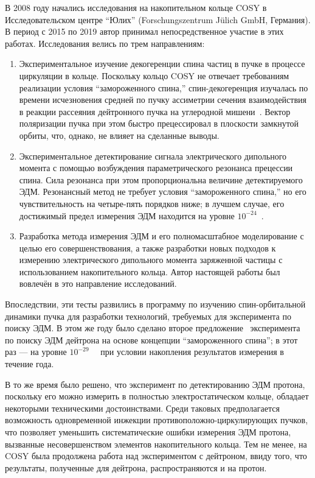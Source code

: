 В 2008 году начались исследования на накопительном кольце COSY в Исследовательском центре ``Юлих'' (Forschungszentrum J\"ulich GmbH, Германия). 
В период с 2015 по 2019 автор принимал непосредственное участие в этих работах. 
Исследования велись по трем направлениям:
\begin{enumerate}[(1)]
	\item Экспериментальное изучение декогеренции спина частиц в пучке в процессе циркуляции в кольце. 
	Поскольку кольцо COSY не отвечает требованиям реализации условия ``замороженного спина,'' 
	спин-декогеренция изучалась по времени исчезновения средней по пучку ассиметрии 
	сечения взаимодействия в реакции рассеяния дейтронного пучка на углеродной мишени~\cite{COSY:SCT:IPAC15}.
	Вектор поляризации пучка при этом быстро прецессировал в плоскости замкнутой орбиты, 
	что, однако, не влияет на сделанные выводы. 
	
	\item Экспериментальное детектирование сигнала электрического дипольного момента с помощью возбуждения параметрического резонанса прецессии спина. Сила резонанса при этом пропорциональна величине детектируемого ЭДМ. Резонансный метод не требует условия ``замороженного спина,'' но его чувствительность на четыре-пять порядков ниже; в лучшем случае, его достижимый предел измерения ЭДМ находится на уровне $10^{-24}$~\ecm. 
	
	\item Разработка метода измерения ЭДМ и его полномасштабное моделирование с целью его совершенствования, а также  разработки новых подходов к измерению электрического дипольного момента заряженной частицы с использованием накопительного кольца. Автор настоящей работы был вовлечён в это направление исследований.
\end{enumerate}

Впоследствии, эти тесты развились в программу по изучению спин-орбитальной динамики пучка 
для разработки технологий, требуемых для эксперимента по поиску ЭДМ. 
В этом же году было сделано второе предложение~\cite{BNL:Deuteron2008} эксперимента 
по поиску ЭДМ дейтрона на основе концепции ``замороженного спина''; 
в этот раз --- на уровне $10^{-29}$~\ecm~ при условии накопления результатов измерения в течение года.

В то же время было решено, что эксперимент по детектированию ЭДМ протона, 
поскольку его можно измерить в полностью электростатическом кольце, 
обладает некоторыми техническими достоинствами. Среди таковых предполагается возможность 
одновременной инжекции противоположно-циркулирующих пучков, что позволяет уменьшить 
систематические ошибки измерения ЭДМ протона, вызванные несовершенством элементов накопительного кольца.
Тем не менее, на COSY была продолжена работа над экспериментом с дейтроном, ввиду того,
что результаты, полученные для дейтрона, распространяются и на протон.

